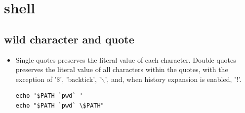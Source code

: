 \documentclass[a4paper,12pt,twoside]{book}
\begin{document}
	


\section{shell}
\subsection{wild character and quote}
\begin{itemize}
\item Single quotes preserves the literal value of each character.  Double quotes preserves the literal value of all characters within the quotes, with the exception of '\$', 'backtick', '$\backslash$', and, when history expansion is enabled, '!'. 
\begin{verbatim}
echo '$PATH `pwd` '
echo "$PATH `pwd` \$PATH"
\end{verbatim}
\end{itemize}
\end{document}
